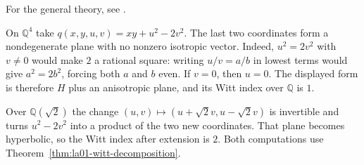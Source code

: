 For the general theory, see \cite[Ch.~II, Secs.~7--8]{witt-source}.

\begin{example}
\label{ex:la01-witt-base-change}
On \(\mathbb{Q}^4\) take \(q(x,y,u,v)=xy+u^2-2v^2\).
The last two coordinates form a nondegenerate plane with no
nonzero isotropic vector. Indeed, \(u^2=2v^2\) with \(v\ne 0\)
would make \(2\) a rational square: writing \(u/v=a/b\) in
lowest terms would give \(a^2=2b^2\), forcing both \(a\) and
\(b\) even. If \(v=0\), then \(u=0\). The displayed form is
therefore \(H\) plus an anisotropic plane, and its Witt index
over \(\mathbb{Q}\) is \(1\).

Over \(\mathbb{Q}(\sqrt{2})\) the change
\((u,v)\mapsto(u+\sqrt{2}v,u-\sqrt{2}v)\) is invertible and
turns \(u^2-2v^2\) into a product of the two new coordinates.
That plane becomes hyperbolic, so the Witt index after extension
is \(2\). Both computations use
Theorem~\ref{thm:la01-witt-decomposition}.
\end{example}
